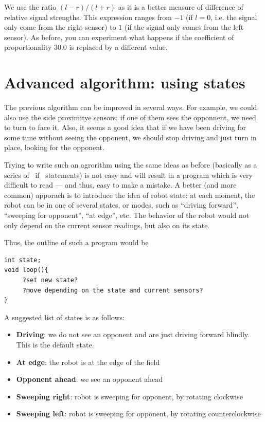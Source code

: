 \documentclass[oneside]{stml-l}
\numberwithin{figure}{chapter}
\begin{document}
We use the ratio $(l-r)/(l+r)$ as it is a better measure of difference 
of relative signal strengths. This expression ranges from $-1$ (if $l=0$, 
i.e. the signal only come from the right sensor) to $1$ (if the signal 
only comes from the left sensor). As before, you can experiment what happens if 
the coefficient of proportionality $30.0$ is replaced by a different value. 


\section{Advanced algorithm: using states}
The previous algorithm can be improved in several ways. For example, 
we could also use the side proximitye sensors: if one of them sees the 
opponnent, we need to turn to face it. Also, it seems a good idea that 
if we have been driving for some time without seeing the opponent,
we should stop driving and just turn in place, looking for the opponent. 

Trying to write such an agrorithm using the same ideas as before (basically 
as a series of ~if~ statements) is not easy and will result in a program 
which is very difficult to read --- and thus, easy to make a mistake. A better 
(and more common) apporach is to  introduce the idea of robot state:
at each moment, the robot can be in one of several states, or modes, such as 
``driving forward'', ``sweeping for opponent'', ``at edge'', etc. The behavior 
of the robot would not only depend on the current sensor readings, but also on 
its state. 

Thus, the outline of such a program would be 
\begin{lstlisting}
int state;
void loop(){
     ?set new state?
     ?move depending on the state and current sensors?
}
\end{lstlisting}

A suggested list of states is as follows:
\begin{itemize}
\item {\bf Driving}: we do not see an opponent and are just driving forward blindly. 
This is the default state.
\item {\bf At edge}: the robot is at the edge of the field
\item {\bf Opponent ahead}: we see an opponent ahead
\item {\bf Sweeping right}: robot is sweeping for opponent, by rotating clockwise
\item {\bf Sweeping left}: robot is sweeping for opponent, by rotating counterclockwise
\end{itemize}
\end{document}
